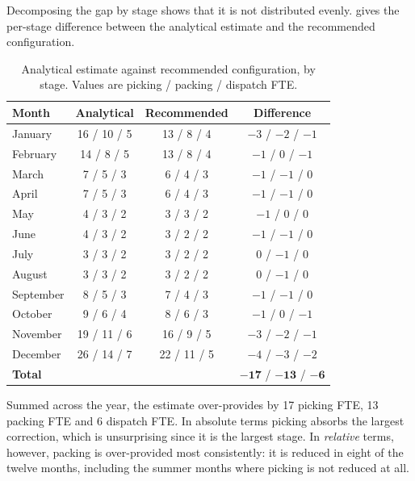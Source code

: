 Decomposing the gap by stage shows that it is not distributed evenly.
 gives the per-stage difference between the analytical estimate and the
recommended configuration.

\begin{table}[htbp]
\centering
\caption[Per-stage difference between estimate and recommendation]{Analytical estimate against
recommended configuration, by stage. Values are picking / packing / dispatch FTE.}
\label{tab:stage-gap}
\small
\begin{tabular}{lccc}
\toprule
\textbf{Month} & \textbf{Analytical} & \textbf{Recommended} & \textbf{Difference} \\
\midrule
January   & 16 / 10 / 5 & 13 / 8 / 4 & \(-3\) / \(-2\) / \(-1\) \\
February  & 14 / 8 / 5  & 13 / 8 / 4 & \(-1\) / \(0\) / \(-1\) \\
March     & 7 / 5 / 3   & 6 / 4 / 3  & \(-1\) / \(-1\) / \(0\) \\
April     & 7 / 5 / 3   & 6 / 4 / 3  & \(-1\) / \(-1\) / \(0\) \\
May       & 4 / 3 / 2   & 3 / 3 / 2  & \(-1\) / \(0\) / \(0\) \\
June      & 4 / 3 / 2   & 3 / 2 / 2  & \(-1\) / \(-1\) / \(0\) \\
July      & 3 / 3 / 2   & 3 / 2 / 2  & \(0\) / \(-1\) / \(0\) \\
August    & 3 / 3 / 2   & 3 / 2 / 2  & \(0\) / \(-1\) / \(0\) \\
September & 8 / 5 / 3   & 7 / 4 / 3  & \(-1\) / \(-1\) / \(0\) \\
October   & 9 / 6 / 4   & 8 / 6 / 3  & \(-1\) / \(0\) / \(-1\) \\
November  & 19 / 11 / 6 & 16 / 9 / 5 & \(-3\) / \(-2\) / \(-1\) \\
December  & 26 / 14 / 7 & 22 / 11 / 5 & \(-4\) / \(-3\) / \(-2\) \\
\midrule
\textbf{Total} & & & \(\mathbf{-17}\) / \(\mathbf{-13}\) / \(\mathbf{-6}\) \\
\bottomrule
\end{tabular}
\end{table}

Summed across the year, the estimate over-provides by 17 picking FTE, 13 packing FTE and 6
dispatch FTE. In absolute terms picking absorbs the largest correction, which is unsurprising
since it is the largest stage. In \emph{relative} terms, however, packing is over-provided most
consistently: it is reduced in eight of the twelve months, including the summer months where
picking is not reduced at all.

